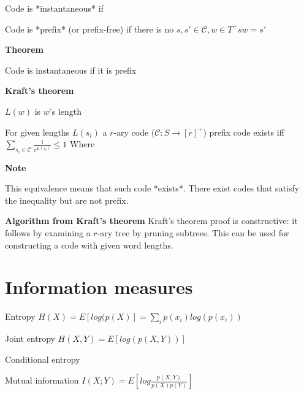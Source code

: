 \documentclass{article}
\begin{document}
Code is *instantaneous* if 

Code is *prefix* (or prefix-free) if there is no $s, s' \in \mathcal{C}, w \in T^+ sw = s'$ 

\textbf{Theorem}

Code is instantaneous if it is prefix

\textbf{Kraft's theorem}

$L(w)$ is $w$'s length

For given lengths $L(s_i)$ a $r$-ary code ($\mathcal{C}: S \to [r]^+$) prefix code exists iff $\sum_{s_i \in \mathcal{C}} \frac{1}{r^{L(s_i)}} \leq 1$ Where 

\textbf{Note}

This equivalence means that such code *exists*. There exist codes that satisfy the inequality but are not prefix.

\textbf{Algorithm from Kraft's theorem}
Kraft's theorem proof is constructive: it follows by examining a $r$-ary tree by pruning subtrees. This can be used for constructing a code with given word lengths.

\section{Information measures}

Entropy $H(X) = E[log(p(X)] = \sum_i p(x_i) log(p(x_i))$

Joint entropy $H(X, Y) = E[log(p(X, Y))]$

Conditional entropy

Mutual information $I(X; Y) = E[log\frac{p(X, Y)}{p(X)p(Y)}]$
\end{document}
